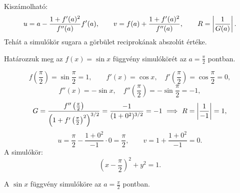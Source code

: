 \documentclass[11pt]{article}
\begin{document}
\begin{thmbox}
\begin{proposition}
Kiszámolható:
\[
u=a-\frac{1+f'(a)^{2}}{f''(a)}f'(a),\qquad v=f(a)+\frac{1+f'(a)^{2}}{f''(a)},\qquad R=\left|\frac{1}{G(a)}\right|.
\]
Tehát a simulókör sugara a görbület reciprokának abszolút értéke.
\end{proposition}
\end{thmbox}

\begin{exbox}
\begin{example}
Határozzuk meg az $f(x)=\sin x$ függvény simulókörét az $a=\frac{\pi}{2}$ pontban.
\end{example}
\end{exbox}
\begin{solution}
\[
f\left(\frac{\pi}{2}\right)=\sin\frac{\pi}{2}=1,\qquad f'(x)=\cos x,\quad f'\left(\frac{\pi}{2}\right)=\cos\frac{\pi}{2}=0,
\]
\[
f''(x)=-\sin x,\quad f''\left(\frac{\pi}{2}\right)=-\sin\frac{\pi}{2}=-1,
\]
\[
G=\frac{f''\left(\frac{\pi}{2}\right)}{\left(1+f'\left(\frac{\pi}{2}\right)^{2}\right)^{3/2}}=\frac{-1}{(1+0^{2})^{3/2}}=-1\ \Longrightarrow\ R=\abs{\frac{1}{-1}}=1,
\]
\[
u=\frac{\pi}{2}-\frac{1+0^{2}}{-1}\cdot 0=\frac{\pi}{2},\qquad v=1+\frac{1+0^{2}}{-1}=0 .
\]
A simulókör:
\[
\left(x-\frac{\pi}{2}\right)^{2}+y^{2}=1 .
\]

\begin{notefig}{A $\sin x$ függvény simulóköre az $a=\frac{\pi}{2}$ pontban.}
\end{notefig}
\end{solution}
\end{document}
